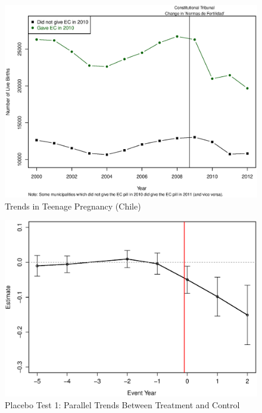\documentclass[10pt,letterpaper,subeqn]{beamer}
\begin{document}
\begin{frame}[label=empirA1]
\begin{figure}
\begin{center}
\caption{Trends in Teenage Pregnancy (Chile)}
\includegraphics[scale=0.45]{./figures/Reform1519.eps}
\end{center}
\end{figure}
\end{frame}

\begin{frame}[label=empirA2]

\end{frame}

\begin{frame}[label=empirA4]
\begin{figure}
\begin{center}
\caption{Placebo Test 1: Parallel Trends Between Treatment and Control}
\includegraphics[scale=0.45]{./figures/Event1519treat.eps}
\end{center}
\end{figure}
\end{frame}
\end{document}
